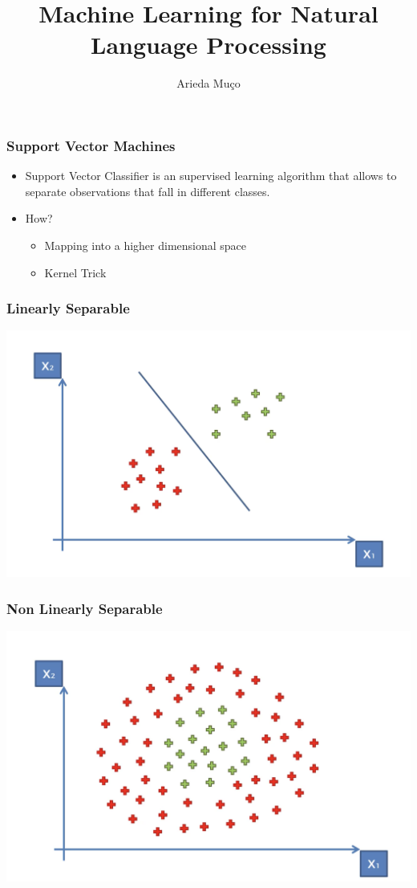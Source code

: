 \documentclass[compress, aspectratio=54]{beamer}
\title[
Support Vector Machines]{Machine Learning for Natural Language Processing}
\author[Arieda Mu\c co]{Arieda Mu\c co}
\institute[CEU]{Central European University}
\begin{document}
\captionsetup[subfigure]{labelformat=empty}

\frame{\titlepage}



\begin{frame}

\frametitle{Support Vector Machines}
\begin{itemize}
\item Support Vector Classifier is an supervised learning algorithm that
allows to separate observations that fall in different classes.
\item How?
\begin{itemize}
\item Mapping into a higher dimensional space
\item Kernel Trick
\end{itemize}
\end{itemize}
\end{frame}

\begin{frame}

\frametitle{Linearly Separable}

\includegraphics[width=0.85\linewidth ]{Figures/svm-1.png}


\end{frame}
\begin{frame}

\frametitle{Non Linearly Separable}

\includegraphics[width=0.85\linewidth ]{Figures/svm-2.png}


\end{frame}
\end{document}

